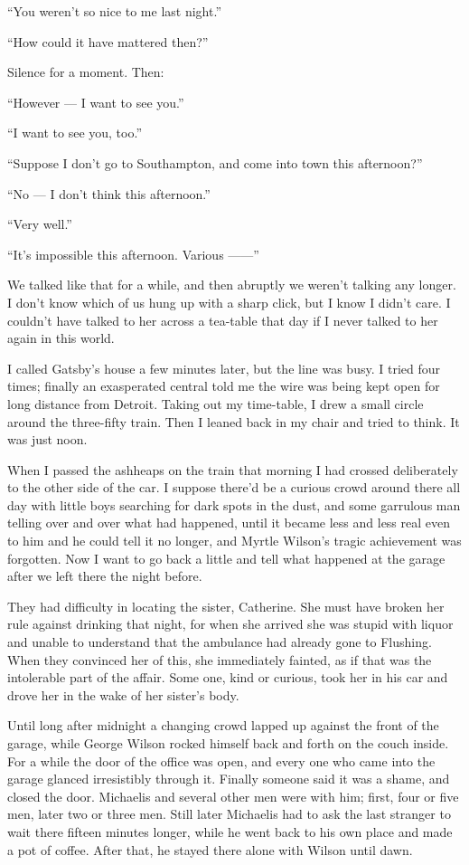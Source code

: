 \documentclass{znotebook}
\begin{document}
``You weren't so nice to me last night.''

``How could it have mattered then?''

Silence for a moment. Then:

``However — I want to see you.''

``I want to see you, too.''

``Suppose I don't go to Southampton, and come into town this afternoon?''

``No — I don't think this afternoon.''

``Very well.''

``It's impossible this afternoon. Various ——''

We talked like that for a while, and then abruptly we weren't talking any longer. I don't know which of us hung up with a sharp click, but I know I didn't care. I couldn't have talked to her across a tea-table that day if I never talked to her again in this world.

I called Gatsby's house a few minutes later, but the line was busy. I tried four times; finally an exasperated central told me the wire was being kept open for long distance from Detroit. Taking out my time-table, I drew a small circle around the three-fifty train. Then I leaned back in my chair and tried to think. It was just noon.

When I passed the ashheaps on the train that morning I had crossed deliberately to the other side of the car. I suppose there'd be a curious crowd around there all day with little boys searching for dark spots in the dust, and some garrulous man telling over and over what had happened, until it became less and less real even to him and he could tell it no longer, and Myrtle Wilson's tragic achievement was forgotten. Now I want to go back a little and tell what happened at the garage after we left there the night before.

They had difficulty in locating the sister, Catherine. She must have broken her rule against drinking that night, for when she arrived she was stupid with liquor and unable to understand that the ambulance had already gone to Flushing. When they convinced her of this, she immediately fainted, as if that was the intolerable part of the affair. Some one, kind or curious, took her in his car and drove her in the wake of her sister's body.

Until long after midnight a changing crowd lapped up against the front of the garage, while George Wilson rocked himself back and forth on the couch inside. For a while the door of the office was open, and every one who came into the garage glanced irresistibly through it. Finally someone said it was a shame, and closed the door. Michaelis and several other men were with him; first, four or five men, later two or three men. Still later Michaelis had to ask the last stranger to wait there fifteen minutes longer, while he went back to his own place and made a pot of coffee. After that, he stayed there alone with Wilson until dawn.
\end{document}
